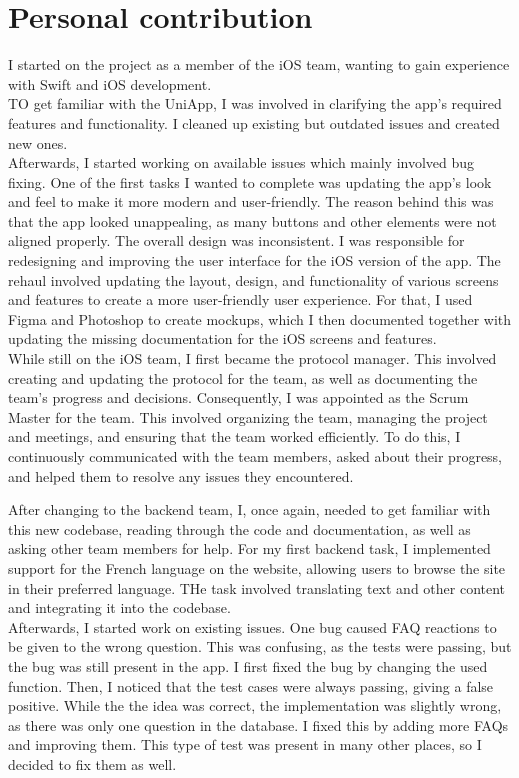 \documentclass[sf-font,usefira,english]{uulm/sp/article}
\begin{document}
\section{Personal contribution}

I started on the project as a member of the iOS team, wanting to gain experience with Swift and iOS development.\\
TO get familiar with the UniApp, I was involved in clarifying the app's required features and functionality. 
I cleaned up existing but outdated issues and created new ones.\\

Afterwards, I started working on available issues which mainly involved bug fixing.
One of the first tasks I wanted to complete was updating the app's look and feel to make it more modern and user-friendly. 
The reason behind this was that the app looked unappealing, as many buttons and other elements were not aligned properly.
The overall design was inconsistent. 
I was responsible for redesigning and improving the user interface for the iOS version of the app. 
The rehaul involved updating the layout, design, and functionality of various screens and features to create a more user-friendly user experience. 
For that, I used Figma and Photoshop to create mockups, which I then documented together with updating the missing documentation for the iOS screens and features.\\

While still on the iOS team, I first became the protocol manager. 
This involved creating and updating the protocol for the team, as well as documenting the team’s progress and decisions. 
Consequently, I was appointed as the Scrum Master for the team. 
This involved organizing the team, managing the project and meetings, and ensuring that the team worked efficiently. 
To do this, I continuously communicated with the team members, asked about their progress, and helped them to resolve any issues they encountered. 

After changing to the backend team, I, once again, needed to get familiar with this new codebase, reading through the code and documentation, as well as asking other team members for help.
For my first backend task, I implemented support for the French language on the website, allowing users to browse the site in their preferred language. 
THe task involved translating text and other content and integrating it into the codebase.\\

Afterwards, I started work on existing issues. 
One bug caused FAQ reactions to be given to the wrong question. 
This was confusing, as the tests were passing, but the bug was still present in the app. 
I first fixed the bug by changing the used function.
Then, I noticed that the test cases were always passing, giving a false positive.
While the the idea was correct, the implementation was slightly wrong, as there was only one question in the database.
I fixed this by adding more FAQs and improving them.
This type of test was present in many other places, so I decided to fix them as well.\\
\end{document}
